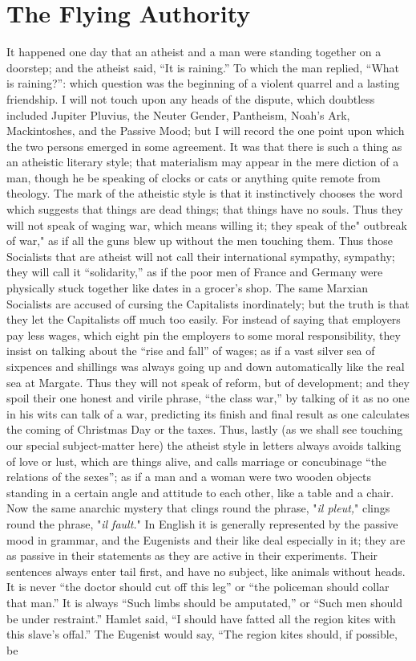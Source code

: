 \documentclass{book}
\begin{document}
\chapter{The Flying Authority}
\label{chapter-6}
It happened one day that an atheist and a man were standing together on a doorstep; and the atheist said, “It is raining.” To which the man replied, “What is raining?”: which question was the beginning of a violent quarrel and a lasting friendship. I will not touch upon any heads of the dispute, which doubtless included Jupiter Pluvius, the Neuter Gender, Pantheism, Noah’s Ark, Mackintoshes, and the Passive Mood; but I will record the one point upon which the two persons emerged in some agreement. It was that there is such a thing as an atheistic literary style; that materialism may appear in the mere diction of a man, though he be speaking of clocks or cats or anything quite remote from theology. The mark of the atheistic style is that it instinctively chooses the word which suggests that things are dead things; that things have no souls. Thus they will not speak of waging war, which means willing it; they speak of the" outbreak of war," as if all the guns blew up without the men touching them. Thus those Socialists that are atheist will not call their international sympathy, sympathy; they will call it “solidarity,” as if the poor men of France and Germany were physically stuck together like dates in a grocer’s shop. The same Marxian Socialists are accused of cursing the Capitalists inordinately; but the truth is that they let the Capitalists off much too easily. For instead of saying that employers pay less wages, which eight pin the employers to some moral responsibility, they insist on talking about the “rise and fall” of wages; as if a vast silver sea of sixpences and shillings was always going up and down automatically like the real sea at Margate. Thus they will not speak of reform, but of development; and they spoil their one honest and virile phrase, “the class war,” by talking of it as no one in his wits can talk of a war, predicting its finish and final result as one calculates the coming of Christmas Day or the taxes. Thus, lastly (as we shall see touching our special subject-matter here) the atheist style in letters always avoids talking of love or lust, which are things alive, and calls marriage or concubinage “the relations of the sexes”; as if a man and a woman were two wooden objects standing in a certain angle and attitude to each other, like a table and a chair. Now the same anarchic mystery that clings round the phrase, "\emph{il pleut,}" clings round the phrase, "\emph{il fault.}" In English it is generally represented by the passive mood in grammar, and the Eugenists and their like deal especially in it; they are as passive in their statements as they are active in their experiments. Their sentences always enter tail first, and have no subject, like animals without heads. It is never “the doctor should cut off this leg” or “the policeman should collar that man.” It is always “Such limbs should be amputated,” or “Such men should be under restraint.” Hamlet said, “I should have fatted all the region kites with this slave’s offal.” The Eugenist would say, “The region kites should, if possible, be 
\end{document}
